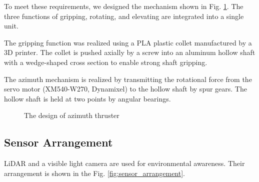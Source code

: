 \documentclass[lettersize,journal]{IEEEtran}
\begin{document}
To meet these requirements, we designed the mechanism shown in Fig. \ref{fig:azimuth_design}.
The three functions of gripping, rotating, and elevating are integrated into a single unit.

The gripping function was realized using a PLA plastic collet manufactured by a 3D printer.
The collet is pushed axially by a screw into an aluminum hollow shaft with a wedge-shaped cross section to enable strong shaft gripping.

The azimuth mechanism is realized by transmitting the rotational force from the servo motor (XM540-W270, Dynamixel) to the hollow shaft by spur gears.
The hollow shaft is held at two points by angular bearings.

\begin{figure}[htbp]
  \begin{center}
  \end{center}
  \caption{The design of azimuth thruster}
  \label{fig:azimuth_design}
\end{figure}

\subsection{Sensor Arrangement}

LiDAR and a visible light camera are used for environmental awareness.
Their arrangement is shown in the Fig. \ref{fig:sensor_arrangement}.
\end{document}
